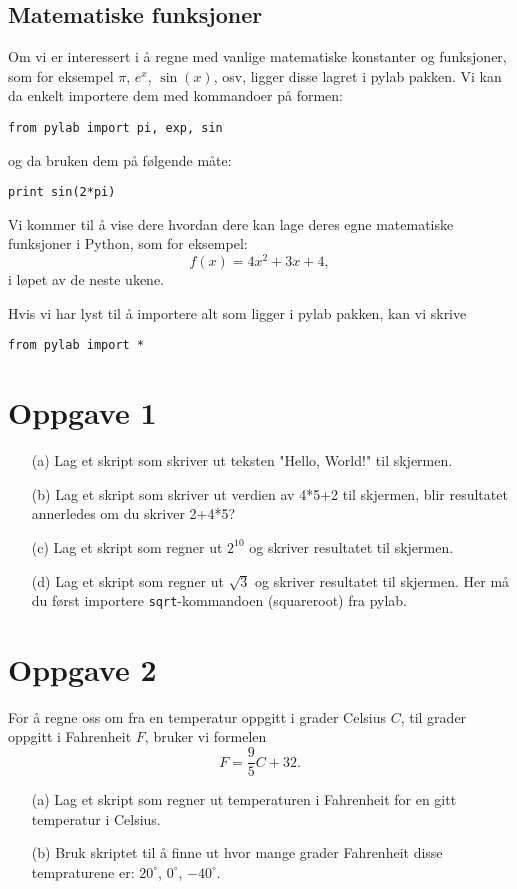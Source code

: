 \documentclass[a4paper, 11pt, notitlepage]{article}
\begin{document}
\subsection*{Matematiske funksjoner}
Om vi er interessert i å regne med vanlige matematiske konstanter og funksjoner, som for eksempel $\pi$, $e^x$, $\sin(x)$, osv, ligger disse lagret i pylab pakken. Vi kan da enkelt importere dem med kommandoer på formen:
\begin{lstlisting}
from pylab import pi, exp, sin
\end{lstlisting}
\vspace{-0.3cm}
og da bruken dem på følgende måte:
\begin{lstlisting}
print sin(2*pi)
\end{lstlisting}
\vspace{-0.3cm}

Vi kommer til å vise dere hvordan dere kan lage deres egne matematiske funksjoner i Python, som for eksempel:
$$f(x) = 4x^2 + 3x + 4,$$
i løpet av de neste ukene.

Hvis vi har lyst til å importere alt som ligger i pylab pakken, kan vi skrive
\begin{lstlisting}
from pylab import *
\end{lstlisting}


\clearpage

\section*{Oppgave 1}
\begin{itemize}
    \item[(a)] Lag et skript som skriver ut teksten "Hello, World!" til skjermen.
    \item[(b)] Lag et skript som skriver ut verdien av 4*5+2 til skjermen, blir resultatet annerledes om du skriver 2+4*5?
    \item[(c)] Lag et skript som regner ut $2^{10}$ og skriver resultatet til skjermen.
    \item[(d)] Lag et skript som regner ut $\sqrt{3}$ og skriver resultatet til skjermen. Her må du først importere \verb+sqrt+-kommandoen (squareroot) fra pylab.
\end{itemize}

\section*{Oppgave 2}
For å regne oss om fra en temperatur oppgitt i grader Celsius $C$, til grader oppgitt i Fahrenheit $F$, bruker vi formelen
$$F = \frac{9}{5}C + 32.$$
\begin{itemize}
    \item[(a)] Lag et skript som regner ut temperaturen i Fahrenheit for en gitt temperatur i Celsius.
    \item[(b)] Bruk skriptet til å finne ut hvor mange grader Fahrenheit disse tempraturene er: $20^\circ$, $0^\circ$, $-40^\circ$.
\end{itemize}
\end{document}
